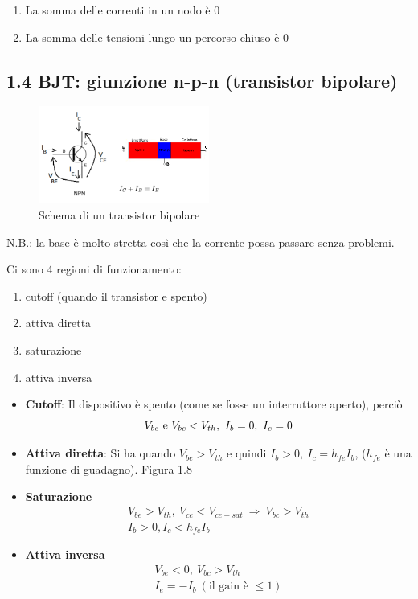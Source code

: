 \documentclass[
]{article}
\providecommand{\tightlist}{%
  \setlength{\itemsep}{0pt}\setlength{\parskip}{0pt}}
\begin{document}
\begin{enumerate}
\def\labelenumi{\arabic{enumi}.}
\tightlist
\item
  La somma delle correnti in un nodo è 0
\item
  La somma delle tensioni lungo un percorso chiuso è 0
\end{enumerate}

\subsection{1.4 BJT: giunzione n-p-n (transistor
bipolare)}\label{bjt-giunzione-n-p-n-transistor-bipolare}

\begin{figure}
\centering
\includegraphics[width=0.5\textwidth,height=\textheight]{immagini/7.png}
\caption{Schema di un transistor bipolare}
\end{figure}

N.B.: la base è molto stretta così che la corrente possa passare senza
problemi.

Ci sono 4 regioni di funzionamento:

\begin{enumerate}
\def\labelenumi{\arabic{enumi}.}
\tightlist
\item
  cutoff (quando il transistor e spento)
\item
  attiva diretta
\item
  saturazione
\item
  attiva inversa
\end{enumerate}

\begin{itemize}
\item
  \textbf{Cutoff}: Il dispositivo è spento (come se fosse un
  interruttore aperto), perciò
  \[V_{be}\ {\rm e}\ V_{bc}<V_{th},\ I_{b}=0,\ I_{c}=0\]
\item
  \textbf{Attiva diretta}: Si ha quando \(V_{be}>V_{th}\) e quindi
  \(I_{b}>0,\ I_{c}=h_{fe}I_{b}\), (\(h_{fe}\) è una funzione di
  guadagno). Figura 1.8
\item
  \textbf{Saturazione} \begin{gather*}
  V_{be}>V_{th},\ V_{ce}<V_{ce-sat}\ \Longrightarrow\ V_{bc}>V_{th} \\
  I_{b}>0,I_{c}<h_{fe}I_{b}
  \end{gather*}
\item
  \textbf{Attiva inversa} \begin{gather*}
  V_{be}<0,\ V_{bc}>V_{th} \\
  I_{e} =-I_{b}\ (\text{il gain è }\leq 1)
  \end{gather*}
\end{itemize}
\end{document}
